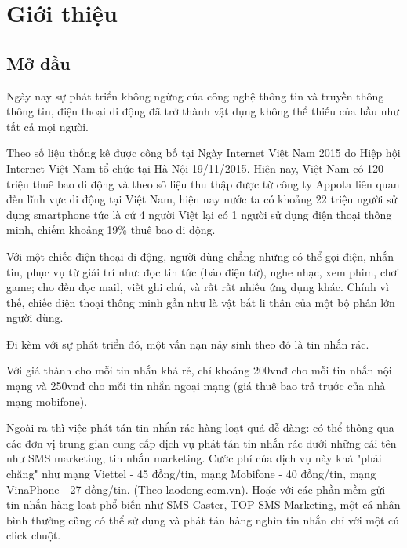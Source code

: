 \chapter{Giới thiệu}
\section{Mở đầu}

Ngày nay sự phát triển không ngừng của công nghệ thông tin và truyền thông thông tin, điện thoại di động đã trở thành vật dụng không thể thiếu của hầu như tất cả mọi người.

Theo số liệu thống kê được công bố tại Ngày Internet Việt Nam 2015 do Hiệp hội Internet Việt Nam tổ chức tại Hà Nội 19/11/2015. Hiện nay, Việt Nam có 120 triệu thuê bao di động và theo sô liệu thu thập được từ công ty Appota liên quan đến lĩnh vực di động tại Việt Nam, hiện nay nước ta có khoảng 22 triệu người sử dụng smartphone tức là cứ 4 người Việt lại có 1 người sử dụng điện thoại thông minh, chiếm khoảng 19\% thuê bao di động.

Với một chiếc điện thoại di động, người dùng chẳng những có thể gọi điện, nhắn tin, phục vụ từ giải trí như: đọc tin tức (báo điện tử), nghe nhạc, xem phim, chơi game; cho đến đọc mail, viết ghi chú, và rất rất nhiều ứng dụng khác. Chính vì thế, chiếc điện thoại thông minh gần như là vật bất li thân của một bộ phân lớn người dùng.
 
Đi kèm với sự phát triển đó, một vấn nạn nảy sinh theo đó là tin nhắn rác.


Với giá thành cho mỗi tin nhắn khá rẻ, chỉ khoảng 200vnđ cho mỗi tin nhắn nội mạng và 250vnđ cho mỗi tin nhắn ngoại mạng (giá thuê bao trả trước của nhà mạng mobifone).

Ngoài ra thì việc phát tán tin nhắn rác hàng loạt quá dễ dàng: có thể thông qua các đơn vị trung gian cung cấp dịch vụ phát tán tin nhắn rác dưới những cái tên như SMS marketing, tin nhắn marketing. Cước phí của dịch vụ này khá "phải chăng" như mạng Viettel - 45 đồng/tin, mạng Mobifone  - 40 đồng/tin, mạng VinaPhone - 27 đồng/tin. (Theo laodong.com.vn). Hoặc với các phần mềm gửi tin nhắn hàng loạt phổ biến như SMS Caster, TOP SMS Marketing, một cá nhân bình thường cũng có thể sử dụng và phát tán hàng nghìn tin nhắn chỉ với một cú click chuột.

